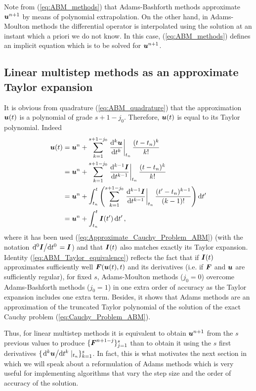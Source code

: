 Note from (\ref{eq:ABM_methods}) that Adams-Bashforth methods approximate $\boldsymbol{u}^{n+1}$ by means of polynomial extrapolation. On the other hand, in Adams-Moulton methods the differential operator is interpolated using the solution at an instant which a priori we do not know. In this case, (\ref{eq:ABM_methods}) defines an implicit equation which is to be solved for $\boldsymbol{u}^{n+1}$.



\subsection{Linear multistep methods as an approximate Taylor expansion}
It is obvious from quadrature (\ref{eq:ABM_quadrature}) that the approximation $\boldsymbol{u}(t)$ is a polynomial of grade $s+1-j_0$. Therefore, $\boldsymbol{u}(t)$ is equal to its Taylor polynomial. Indeed
%
\begin{align}
	\vect{u}(t)
	& =
	\vect{u}^n
	+
	\sum_{k = 1}^{s+1-j_0}
	\eval{ \dv[k]{\vect{u}}{t} }_{t_n}
	\frac{(t-t_n)^k}{k!}
	\nonumber 
	\\
	& =
	\vect{u}^n
	+
	\sum_{k = 1}^{s+1-j_0}
	\eval{ \dv[k-1]{\vect{I}}{t} }_{t_n}
	\frac{(t-t_n)^k}{k!}
	\nonumber 
	\\
	& =
	\vect{u}^n
	+
	\int_{t_n}^{t}
	\left(
	\sum_{k = 1}^{s+1-j_0}
	\eval{ \dv[k-1]{\vect{I}}{t} }_{t_n}
	\frac{(t'-t_n)^{k-1}}{(k-1)!}
	\right)
	\dd{t'}
	\nonumber 
	\\
	& =
	\vect{u}^n
	+
	\int_{t_n}^{t}
	\vect{I}(t')
	\dd{t'},
	\label{eq:ABM_Taylor_equivalence}
\end{align}
where it has been used (\ref{eq:Approximate_Cauchy_Problem_ABM}) (with the notation $\dv*[0]{\boldsymbol{I}}{t}=\boldsymbol{I}$) and that $\boldsymbol{I}(t)$ also matches exactly its Taylor expansion. Identity (\ref{eq:ABM_Taylor_equivalence}) reflects the fact that if $\boldsymbol{I}(t)$ approximates sufficiently well $\boldsymbol{F}(\boldsymbol{u}(t),t)$ and its derivatives (i.e. if $\boldsymbol{F}$ and $\boldsymbol{u}$ are sufficiently regular), for fixed $s$, Adams-Moulton methods ($j_0=0$) overcome Adams-Bashforth methods ($j_0=1$) in one extra order of accuracy as the Taylor expansion includes one extra term. Besides, it shows that Adams methods are an approximation of the truncated Taylor polynomial of the solution of the exact Cauchy problem (\ref{eq:Cauchy_Problem_ABM}).

Thus, for linear multistep methods it is equivalent to obtain $\boldsymbol{u}^{n+1}$ from the $s$ previous values to produce $\{\boldsymbol{F}^{n+1-j}\}_{j=1}^{s}$ than to obtain it using the $s$ first derivatives 
$\{  \dv*[k]{\boldsymbol{u}}{t} |_{t_n} \}_{k=1}^{s}$. In fact, this is what motivates the next section in which we will speak about a reformulation of Adams methods which is very useful for implementing algorithms that vary the step size and the order of accuracy of the solution.

